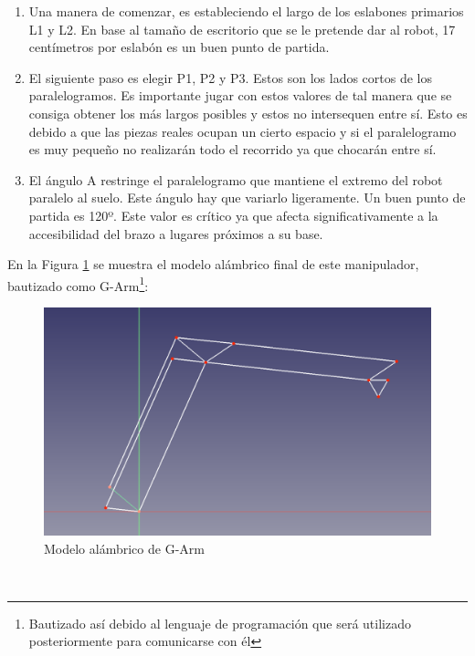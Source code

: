 \begin{enumerate}
\item Una manera de comenzar, es estableciendo el largo de los eslabones primarios L1 y L2. En base al tamaño de escritorio que se le pretende 
dar al robot, 17 centímetros por eslabón es un buen punto de partida.
\item El siguiente paso es elegir P1, P2 y P3. Estos son los lados cortos de los paralelogramos. Es importante jugar con estos valores 
de tal manera que se consiga obtener los más largos posibles y estos no intersequen entre sí. Esto es debido a que las piezas reales ocupan un cierto espacio y si el paralelogramo es 
muy pequeño no realizarán todo el recorrido ya que chocarán entre sí. 
\item El ángulo A restringe el paralelogramo que mantiene el extremo del robot paralelo al suelo. Este ángulo hay que variarlo ligeramente. Un buen 
punto de partida es 120º. Este valor es crítico ya que afecta significativamente a la accesibilidad del brazo a lugares próximos a su base. 
\end{enumerate}
\newpage
En la Figura \ref{fig:g_arm_alambrico} se muestra el modelo alámbrico final de este manipulador, bautizado como G-Arm\footnote{Bautizado así 
debido al lenguaje de programación que será utilizado posteriormente para comunicarse con él}:\\
\begin{figure} [ht!]
  \begin{center}
    \includegraphics[width=15cm]{figs/alambrico_garm.png}
  \end{center}
  \caption{Modelo alámbrico de G-Arm}
  \label{fig:g_arm_alambrico}
\end{figure}\ 

